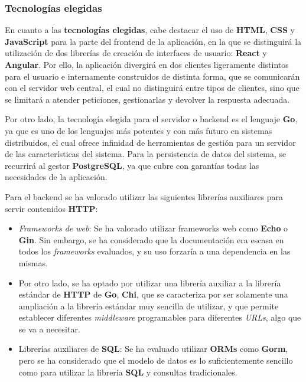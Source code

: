 \documentclass[11pt, a4paper, titlepage]{article}
\begin{document}
\subsubsection{Tecnologías elegidas}

En cuanto a las \textbf{tecnologías elegidas}, cabe destacar el uso de \textbf{HTML}, \textbf{CSS} y \textbf{JavaScript} para la parte del frontend de la aplicación, en la que se distinguirá la utilización de dos librerías de creación de interfaces de usuario: \textbf{React} y \textbf{Angular}. Por ello, la aplicación divergirá en dos clientes ligeramente distintos para el usuario e internamente construidos de distinta forma, que se comunicarán con el servidor web central, el cual no distinguirá entre tipos de clientes, sino que se limitará a atender peticiones, gestionarlas y devolver la respuesta adecuada. \newline

Por otro lado, la tecnología elegida para el servidor o backend es el lenguaje \textbf{Go}, ya que es uno de los lenguajes más potentes y con más futuro en sistemas distribuidos, el cual ofrece infinidad de herramientas de gestión para un servidor de las características del sistema. Para la persistencia de datos del sistema, se recurrirá al gestor \textbf{PostgreSQL}, ya que cubre con garantías todas las necesidades de la aplicación. \newline


Para el backend se ha valorado utilizar las siguientes librerías auxiliares para servir contenidos \textbf{HTTP}:

\begin{itemize}
    \item \textit{Frameworks de web}: Se ha valorado utilizar frameworks web como \textbf{Echo} o \textbf{Gin}. Sin embargo, se ha considerado que  la documentación era escasa en todos los \textit{frameworks} evaluados, y su uso forzaría a una dependencia en las mismas. 
    
    \item Por otro lado, se ha optado por utilizar una librería auxiliar a la librería estándar de \textbf{HTTP} de \textbf{Go}, \textbf{Chi}, que se caracteriza por ser solamente una ampliación a la librería estándar muy sencilla de utilizar, y que permite establecer diferentes \textit{middleware} programables para diferentes \textit{URLs}, algo que se va a necesitar.
    
    \item Librerías auxiliares de \textbf{SQL}: Se ha evaluado utilizar \textbf{ORMs} como \textbf{Gorm}, pero se ha considerado que el modelo de datos es lo suficientemente sencillo como para utilizar la librería \textbf{SQL} y consultas tradicionales.
\end{itemize}
\end{document}
